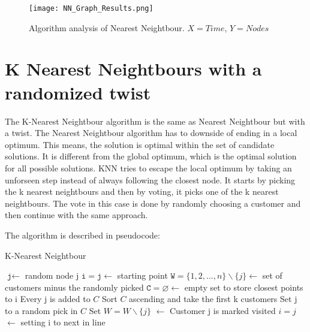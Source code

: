 \documentclass[12pt]{article}
\newcommand{\var}{\texttt}
\begin{document}
\begin{figure}[H]
	\caption{Algorithm analysis of Nearest Neightbour. $X = Time$, $Y = Nodes$}
	\centering
	\texttt{[image: NN\_Graph\_Results.png]}
	\label{fig:nnanalysis}

\end{figure}

\newpage

\section{K Nearest Neightbours with a randomized twist} 

The K-Nearest Neightbour algorithm is the same as Nearest Neightbour but with a twist. The Nearest Neightbour algorithm has to downside of ending in a local optimum. This means, the solution is optimal within the set of candidate solutions. It is different from the global optimum, which is the optimal solution for all possible solutions. KNN tries to escape the local optimum by taking an unforseen step instead of always following the closest node. It starts by picking the k nearest neightbours and then by voting, it picks one of the k nearest neightbours. The vote in this case is done by randomly choosing a customer and then continue with the same approach. 

The algorithm is described in pseudocode:
\newline

\begin{algorithm}[!ht]
	\caption{K-Nearest Neightbour}\label{euclid}
	\begin{algorithmic}[1]
	\State $\var{j} \gets$ random node j
	\State $\var{i} = \var{j} \gets$ starting point
	\State $\var{W} = \{1, 2, ..., n\} \backslash \{j\} \gets$ set of customers minus the randomly picked
	\State $\var{C} = \varnothing \gets$ empty set to store closest points to i
			\State {}
			\State Every j is added to $C$
			\State Sort $C$ ascending and take the first k customers
			\State Set j to a random pick in $C$
			\State Set $W = W \backslash \{j\}$ $\gets$ Customer j is marked visited
			\State $i = j$ $\gets$ setting i to next in line

		\EndWhile
	\EndFunction

	\end{algorithmic}
\end{algorithm}
\end{document}
